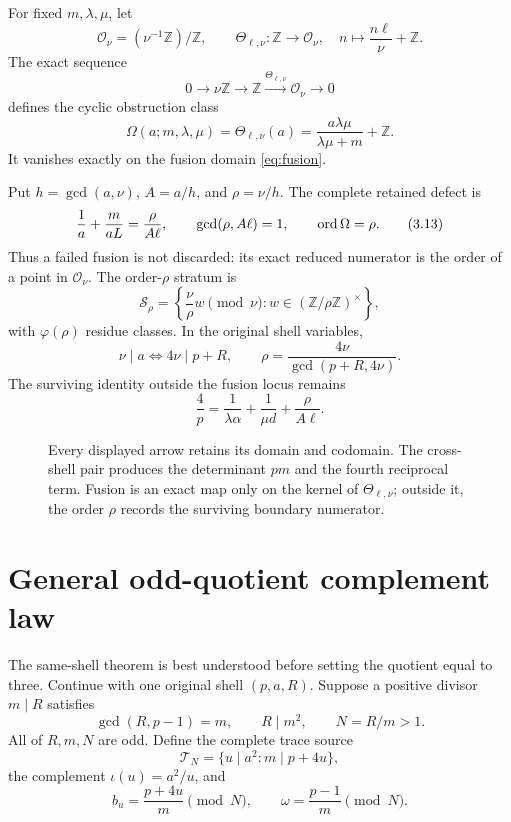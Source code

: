 \begin{definition}\label{def:boundary-obstruction}
For fixed $m,\lambda,\mu$, let
\[
 \mathcal O_\nu=(\nu^{-1}\mathbb Z)/\mathbb Z,\qquad
 \Theta_{\ell,\nu}:\mathbb Z\longrightarrow\mathcal O_\nu,\quad
 n\longmapsto\frac{n\ell}{\nu}+\mathbb Z.                       \tag{3.10}
\]
The exact sequence
\[
 0\longrightarrow\nu\mathbb Z\longrightarrow\mathbb Z
 \xrightarrow{\Theta_{\ell,\nu}}\mathcal O_\nu\longrightarrow0 \tag{3.11}
\]
defines the cyclic obstruction class
\[
 \Omega(a;m,\lambda,\mu)
 =\Theta_{\ell,\nu}(a)
 =\frac{a\lambda\mu}{\lambda\mu+m}+\mathbb Z.                  \tag{3.12}
\]
It vanishes exactly on the fusion domain \eqref{eq:fusion}.
\end{definition}

Put $h=\gcd(a,\nu)$, $A=a/h$, and $\rho=\nu/h$.  The complete retained defect is
\[
 \frac1a+\frac{m}{aL}=\frac{\rho}{A\ell},\qquad
 \gcd(\rho,A\ell)=1,
 \qquad \mathop{\mathrm{ord}}\Omega=\rho.                                       \tag{3.13}
\]
Thus a failed fusion is not discarded: its exact reduced numerator is the
order of a point in $\mathcal O_\nu$.  The order-$\rho$ stratum is
\[
 \mathcal S_\rho=
 \left\{\frac{\nu}{\rho}w\pmod\nu:
 w\in(\mathbb Z/\rho\mathbb Z)^\times\right\},                  \tag{3.14}
\]
with $\varphi(\rho)$ residue classes.  In the original shell variables,
\[
 \nu\mid a\Longleftrightarrow4\nu\mid p+R,\qquad
 \rho=\frac{4\nu}{\gcd(p+R,4\nu)}.                             \tag{3.15}
\]
The surviving identity outside the fusion locus remains
\[
 \frac4p=\frac1{\lambda\alpha}+\frac1{\mu d}
 +\frac{\rho}{A\ell}.                                           \tag{3.16}
\]

\begin{figure}[ht]
\centering

\caption{Every displayed arrow retains its domain and codomain.  The cross-shell
pair produces the determinant $pm$ and the fourth reciprocal term.  Fusion is
an exact map only on the kernel of $\Theta_{\ell,\nu}$; outside it, the order
$\rho$ records the surviving boundary numerator.}
\label{fig:cross-shell}
\end{figure}

\section{General odd-quotient complement law}

The same-shell theorem is best understood before setting the quotient equal to
three.  Continue with one original shell $(p,a,R)$.  Suppose a positive divisor
$m\mid R$ satisfies
\[
 \gcd(R,p-1)=m,\qquad R\mid m^2,\qquad N=R/m>1.               \tag{4.1}\label{eq:Ndomain}
\]
All of $R,m,N$ are odd.  Define the complete trace source
\[
 \mathcal T_N=\{u\mid a^2:m\mid p+4u\},                         \tag{4.2}
\]
the complement $\iota(u)=a^2/u$, and
\[
 b_u=\frac{p+4u}{m}\pmod N,\qquad
 \omega=\frac{p-1}{m}\pmod N.                                 \tag{4.3}
\]


